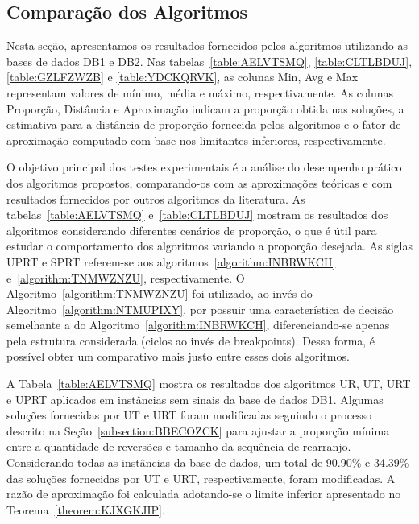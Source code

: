 \subsection{Comparação dos Algoritmos}

Nesta seção, apresentamos os resultados fornecidos pelos algoritmos utilizando as bases de dados DB1 e DB2. Nas tabelas~\ref{table:AELVTSMQ}, \ref{table:CLTLBDUJ}, \ref{table:GZLFZWZB} e \ref{table:YDCKQRVK}, as colunas Min, Avg e Max representam valores de mínimo, média e máximo, respectivamente. As colunas Proporção, Distância e Aproximação indicam a proporção obtida nas soluções, a estimativa para a distância de proporção fornecida pelos algoritmos e o fator de aproximação computado com base nos limitantes inferiores, respectivamente.

O objetivo principal dos testes experimentais é a análise do desempenho prático dos algoritmos propostos, comparando-os com as aproximações teóricas e com resultados fornecidos por outros algoritmos da literatura. As tabelas~\ref{table:AELVTSMQ} e~\ref{table:CLTLBDUJ} mostram os resultados dos algoritmos considerando diferentes cenários de proporção, o que é útil para estudar o comportamento dos algoritmos variando a proporção desejada. As siglas UPRT e SPRT referem-se aos algoritmos~\ref{algorithm:INBRWKCH} e~\ref{algorithm:TNMWZNZU}, respectivamente. O Algoritmo~\ref{algorithm:TNMWZNZU} foi utilizado, ao invés do Algoritmo~\ref{algorithm:NTMUPIXY}, por possuir uma característica de decisão semelhante a do Algoritmo~\ref{algorithm:INBRWKCH}, diferenciando-se apenas pela estrutura considerada (ciclos ao invés de breakpoints). Dessa forma, é possível obter um comparativo mais justo entre esses dois algoritmos. 

A Tabela~\ref{table:AELVTSMQ} mostra os resultados dos algoritmos UR, UT, URT e UPRT aplicados em instâncias sem sinais da base de dados DB1. Algumas soluções fornecidas por UT e URT foram modificadas seguindo o processo descrito na Seção~\ref{subsection:BBECOZCK} para ajustar a proporção mínima entre a quantidade de reversões e tamanho da sequência de rearranjo. Considerando todas as instâncias da base de dados, um total de 90.90\% e 34.39\% das soluções fornecidas por UT e URT, respectivamente, foram modificadas. A razão de aproximação foi calculada adotando-se o limite inferior apresentado no Teorema~\ref{theorem:KJXGKJIP}.

